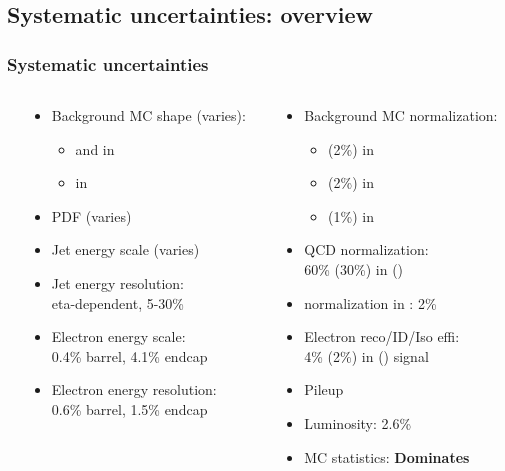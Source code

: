 \documentclass[bigger]{beamer}
\providecommand{\alert}[1]{\textbf{#1}}
\begin{document}
\subsection{Systematic uncertainties: overview}
\label{sec-4-1}
\begin{frame}
\frametitle{Systematic uncertainties}
\label{sec-4-1-1}
\begin{columns} %
\label{sec-4-1-1-1}
\begin{column}{0.55\textwidth}
\label{sec-4-1-1-1-1}

\ChangeItemFont{\footnotesize}{\footnotesize}{\footnotesize}
\begin{itemize}
\item Background MC shape (varies):
\begin{itemize}
\item \wjets and \ttbar in \enujj
\item \zjets in \eejj
\end{itemize}
\item PDF (varies)
\item Jet energy scale (varies)
\item Jet energy resolution: \\
eta-dependent, 5-30\%
\item Electron energy scale: \\
0.4\% barrel, 4.1\% endcap
\item Electron energy resolution: \\
0.6\% barrel, 1.5\% endcap
\end{itemize}
\end{column}
\begin{column}{0.55\textwidth}
\label{sec-4-1-1-1-2}

\ChangeItemFont{\footnotesize}{\footnotesize}{\footnotesize}
\begin{itemize}
\item Background MC normalization:
\begin{itemize}
\item \wjets (2\%) in \enujj
\item \ttbar (2\%) in \enujj
\item \zjets (1\%) in \eejj
\end{itemize}
\item QCD normalization: \\
60\% (30\%) in \eejj (\enujj)
\item \ttbar normalization in \eejj: 2\%
\item Electron reco/ID/Iso effi: \\
4\% (2\%) in \eejj (\enujj) signal
\item Pileup
\item Luminosity: 2.6\%
\item MC statistics: \alert{Dominates}
\end{itemize}
\end{column}
\end{columns}
\end{frame}
\end{document}
